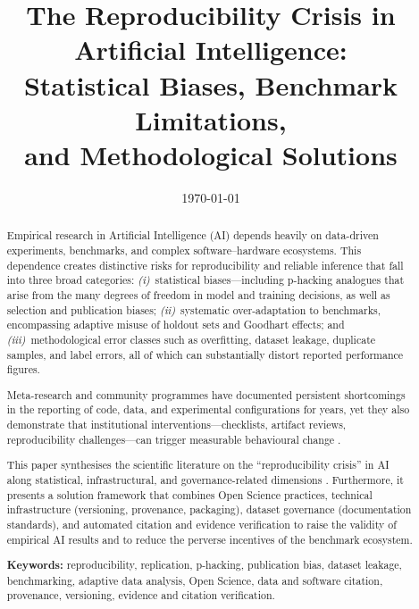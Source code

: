 \documentclass[12pt, a4paper]{article}
\title{%
  The Reproducibility Crisis in Artificial Intelligence:\\[4pt]
  \large Statistical Biases, Benchmark Limitations,\\
  and Methodological Solutions%
}
\author{}
\date{\today}
\begin{document}
\maketitle
\thispagestyle{empty}

\begin{abstract}
\noindent
Empirical research in Artificial Intelligence (AI) depends heavily on
data-driven experiments, benchmarks, and complex software--hardware
ecosystems.  This dependence creates distinctive risks for
reproducibility and reliable inference that fall into three broad
categories: \emph{(i)}~statistical biases---including p-hacking
analogues that arise from the many degrees of freedom in model and
training decisions, as well as selection and publication biases;
\emph{(ii)}~systematic over-adaptation to benchmarks, encompassing
adaptive misuse of holdout sets and Goodhart effects; and
\emph{(iii)}~methodological error classes such as overfitting, dataset
leakage, duplicate samples, and label errors, all of which can
substantially distort reported performance figures.

Meta-research and community programmes have documented persistent
shortcomings in the reporting of code, data, and experimental
configurations for years, yet they also demonstrate that institutional
interventions---checklists, artifact reviews, reproducibility
challenges---can trigger measurable behavioural change
\cite{Pineau2021,NeurIPSChecklist2023}.

This paper synthesises the scientific literature on the
``reproducibility crisis'' in AI along statistical, infrastructural, and
governance-related dimensions \cite{Goodman2016,NationalAcademies2019}.
Furthermore, it presents a solution framework that combines Open Science
practices, technical infrastructure (versioning, provenance, packaging),
dataset governance (documentation standards), and automated citation and
evidence verification to raise the validity of empirical AI results and
to reduce the perverse incentives of the benchmark ecosystem.

\medskip\noindent
\textbf{Keywords:}
reproducibility, replication, p-hacking, publication bias, dataset
leakage, benchmarking, adaptive data analysis, Open Science, data and
software citation, provenance, versioning, evidence and citation
verification.
\end{abstract}
\end{document}
